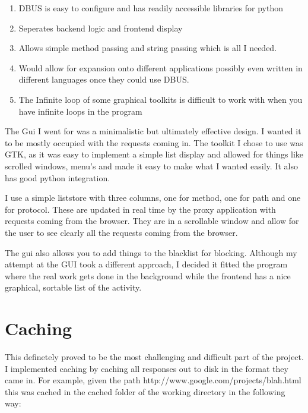 \documentclass{article}
\begin{document}
\begin{enumerate}
\item  DBUS is easy to configure and has readily accessible libraries for python
\item  Seperates backend logic and frontend display
\item  Allows simple method passing and string passing which is all I needed.
\item  Would allow for expansion onto different applications possibly even written in different languages once they could use DBUS.
\item  The Infinite loop of some graphical toolkits is difficult to work with when you have infinite loops in the program
\end{enumerate}


The Gui I went for was a  minimalistic but ultimately effective design. I wanted it to be mostly occupied with the requests coming in. The toolkit I chose to use was GTK, as it was easy to implement a simple list display and allowed for things like scrolled windows, menu's and made it easy to make what I wanted easily. It also has good python integration.



I use a simple liststore with three columns, one for method, one for path and one for protocol. These are updated in real time by the proxy application with requests coming from the browser. They are in a scrollable window and allow for the user to see clearly all the requests coming from the browser.



The gui also allows you to add things to the blacklist for blocking. Although my attempt at the GUI took a different approach, I decided it fitted the program where the real work gets done in the background while the frontend has a nice graphical, sortable list of the activity.



\section*{ Caching}


This definetely proved to be the most challenging and difficult part of the project. I implemented caching by caching all responses out to disk in the format they came in. For example, given the path http://www.google.com/projects/blah.html this was cached in the cached folder of the working directory in the following way:
\end{document}
